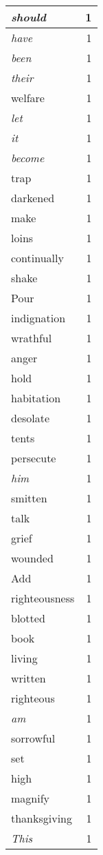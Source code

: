 \begin{center}
\begin{longtable}{l|r}
\emph{should} & 1\\ \hline 
\emph{have} & 1\\ \hline 
\emph{been} & 1\\ \hline 
\emph{their} & 1\\ \hline 
welfare & 1\\ \hline 
\emph{let} & 1\\ \hline 
\emph{it} & 1\\ \hline 
\emph{become} & 1\\ \hline 
trap & 1\\ \hline 
darkened & 1\\ \hline 
make & 1\\ \hline 
loins & 1\\ \hline 
continually & 1\\ \hline 
shake & 1\\ \hline 
Pour & 1\\ \hline 
indignation & 1\\ \hline 
wrathful & 1\\ \hline 
anger & 1\\ \hline 
hold & 1\\ \hline 
habitation & 1\\ \hline 
desolate & 1\\ \hline 
tents & 1\\ \hline 
persecute & 1\\ \hline 
\emph{him} & 1\\ \hline 
smitten & 1\\ \hline 
talk & 1\\ \hline 
grief & 1\\ \hline 
wounded & 1\\ \hline 
Add & 1\\ \hline 
righteousness & 1\\ \hline 
blotted & 1\\ \hline 
book & 1\\ \hline 
living & 1\\ \hline 
written & 1\\ \hline 
righteous & 1\\ \hline 
\emph{am} & 1\\ \hline 
sorrowful & 1\\ \hline 
set & 1\\ \hline 
high & 1\\ \hline 
magnify & 1\\ \hline 
thanksgiving & 1\\ \hline 
\emph{This} & 1\\ \hline 

\end{longtable}
\end{center}
